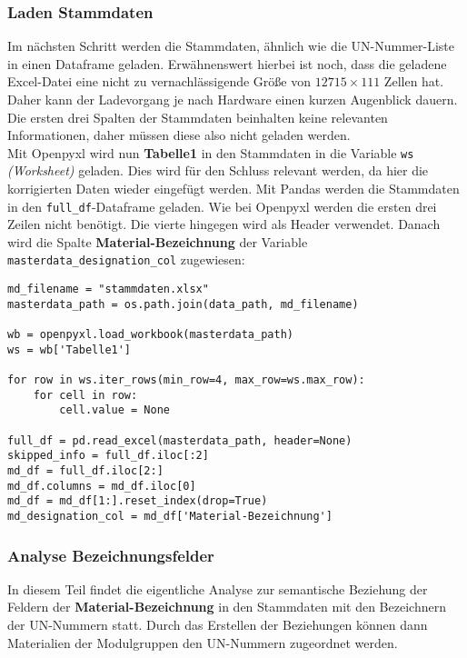 \newpage

\subsubsection{Laden Stammdaten}

Im nächsten Schritt werden die Stammdaten, ähnlich wie die UN-Nummer-Liste
in einen Dataframe geladen. Erwähnenswert hierbei ist noch, dass die geladene
Excel-Datei eine nicht zu vernachlässigende Größe von $12715 \times 111$ Zellen
hat. Daher kann der Ladevorgang je nach Hardware einen kurzen Augenblick dauern.
Die ersten drei Spalten der Stammdaten beinhalten keine relevanten
Informationen, daher müssen diese also nicht geladen werden.\\

Mit Openpyxl wird nun \textbf{Tabelle1} in den Stammdaten in die
Variable \texttt{ws} \textit{(Worksheet)} geladen. Dies wird für den Schluss
relevant werden, da hier die korrigierten Daten wieder eingefügt werden. Mit
Pandas werden die Stammdaten in den \texttt{full\_df}-Dataframe geladen. Wie bei
Openpyxl werden die ersten drei Zeilen nicht benötigt. Die vierte hingegen
wird als Header verwendet. Danach wird die Spalte
\textbf{Material-Bezeichnung} der Variable \texttt{masterdata\_designation\_col}
zugewiesen:\\

\begin{lstlisting}
md_filename = "stammdaten.xlsx"
masterdata_path = os.path.join(data_path, md_filename)

wb = openpyxl.load_workbook(masterdata_path)
ws = wb['Tabelle1']

for row in ws.iter_rows(min_row=4, max_row=ws.max_row):
    for cell in row:
        cell.value = None

full_df = pd.read_excel(masterdata_path, header=None)
skipped_info = full_df.iloc[:2]
md_df = full_df.iloc[2:]
md_df.columns = md_df.iloc[0] 
md_df = md_df[1:].reset_index(drop=True)
md_designation_col = md_df['Material-Bezeichnung']
\end{lstlisting}

\subsubsection{Analyse Bezeichnungsfelder}

In diesem Teil findet die eigentliche Analyse zur semantische Beziehung der
Feldern der \textbf{Material-Bezeichnung} in den Stammdaten mit den Bezeichnern
der UN-Nummern statt. Durch das Erstellen der Beziehungen können dann
Materialien der Modulgruppen den UN-Nummern zugeordnet werden. 
\newpage

